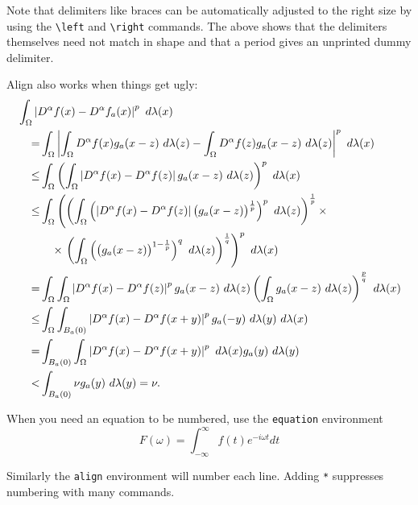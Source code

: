 Note that delimiters like braces can be automatically adjusted to the right size by using the \verb+\left+ and \verb+\right+ commands.
The above shows that the delimiters themselves need not match in shape and that a period gives an unprinted dummy delimiter.

Align also works when things get ugly:
\begin{align*}
	\MoveEqLeft
	\int _{\Omega
	} \left|
	D^\alpha f(x)
	-D^\alpha f_a (x)\right| ^p
	\ d\lambda (x)
	\\
	= &
	\int _{\Omega
	}
	\left| \int _\Omega D^\alpha f(x) g_a (x-z) \ d\lambda (z)-
	\int _\Omega D^\alpha f (z) g_a (x-z)  \ d\lambda (z)
	\right| ^p
	\ d\lambda (x)
	\\
	\leq &
	\int _\Omega \left(
	\int _\Omega \left| D^\alpha f(x)-D^\alpha f (z) \right|
	g_a (x-z)  \ d\lambda (z)
	\right) ^p
	\ d\lambda (x)
	\\
	\leq &
	\int _\Omega \left(
	\left(
	\int _\Omega \left( \left| D^\alpha f(x)-D^\alpha f (z) \right|
	\big( g_a (x-z)\big) ^{\frac{1}{p}}  \right) ^p \ d\lambda (z)
	\right) ^{\frac{1}{p}}
	\times \right.
	\\
	&
	\quad
	\times
	\left.
	\left(
	\int _\Omega
	\left(
	\big( g_a (x-z)\big) ^{1-{\frac{1}{p}}}  \right) ^q \ d\lambda (z)
	\right) ^\frac{1}{q}
	\right) ^p
	\ d\lambda (x)
	\\
	= &
	\int _\Omega
	\int _\Omega \left| D^\alpha f(x)-D^\alpha f (z) \right| ^p
	g_a (x-z) \ d\lambda (z)
	\left(
	\int _\Omega
	g_a (x-z)   \ d\lambda (z)
	\right) ^{\frac{p}{q}}
	\ d\lambda (x)
	\\
	\leq &
	\int _\Omega
	\int _{B_a (0)} \left| D^\alpha f(x)-D^\alpha f (x+y) \right| ^p
	g_a (-y) \ d\lambda (y)
	\ d\lambda (x)
	\\
	= &
	\int _{B_a (0)}
	\int _\Omega
	\left| D^\alpha f(x)-D^\alpha f (x+y) \right| ^p
	\ d\lambda (x)
	g_a (y) \ d\lambda (y)
	\\
	< &
	\int _{B_a (0)}
	\nu
	g_a (y) \ d\lambda (y)
	=\nu .
\end{align*}

\newpage

When you need an equation to be numbered, use the \verb+equation+ environment
\begin{equation}\label{fourier}
	F(\omega) = \int_{-\infty}^\infty f(t) e^{-i\omega t}dt
\end{equation}

Similarly the \verb+align+ environment will number each line.
Adding \verb+*+ suppresses numbering with many commands.


